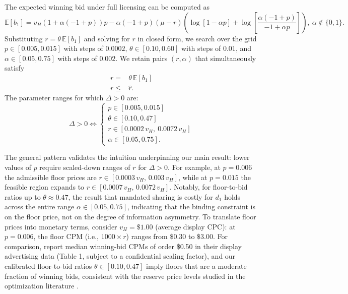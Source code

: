 \documentclass[11pt]{article}
\theoremstyle{plain}
\theoremstyle{definition}
\theoremstyle{plain}
\theoremstyle{plain}
\theoremstyle{plain}
\theoremstyle{plain}
\numberwithin{equation}{section}
\begin{document}
\vspace{2mm}

\noindent The expected winning bid under full licensing can be computed as
\begin{equation*}
    \mathbb{E}[b_1] = v_H (1+\alpha (-1+p)) p-\alpha (-1+p) (\mu-r) \left(\log[1-\alpha p]+\log\left[\frac{\alpha (-1+p)}{-1+\alpha p}\right]\right), \ \alpha \notin \{0,1\}.
\end{equation*}
Substituting $r = \theta \, \mathbb{E}[b_1]$ and solving for $r$ in closed form, we search over the grid $p \in [0.005, 0.015]$ with steps of $0.0002$, $\theta \in [0.10, 0.60]$ with steps of $0.01$, and $\alpha \in [0.05, 0.75]$ with steps of $0.002$. We retain pairs $(r, \alpha)$ that simultaneously satisfy
\begin{align}
    r =&  \theta \, \mathbb{E}[b_1] \label{eq:cal-floor}\\[5pt]
    r \leq&  \hat{r}. \label{eq:cal-rhat}
\end{align}
The parameter ranges for which $\Delta > 0$ are:
\begin{equation*}
    \Delta > 0 \iff \begin{cases}
        p \in [0.005, 0.015] \\[5pt]
        \theta \in [0.10, 0.47] \\[5pt]
        r \in [0.0002 \, v_H, \ 0.0072 \, v_H] \\[5pt]
        \alpha \in [0.05, 0.75].
    \end{cases}
\end{equation*}

\noindent The general pattern validates the intuition underpinning our main result: lower values of $p$ require scaled-down ranges of $r$ for $\Delta > 0$. For example, at $p = 0.006$ the admissible floor prices are $r \in [0.0003 \, v_H, \, 0.003 \, v_H]$, while at $p = 0.015$ the feasible region expands to $r \in [0.0007 \, v_H, \, 0.0072 \, v_H]$. Notably, for floor-to-bid ratios up to $\theta \approx 0.47$, the result that mandated sharing is costly for $d_1$ holds across the entire range $\alpha \in [0.05, 0.75]$, indicating that the binding constraint is on the floor price, not on the degree of information asymmetry. To translate floor prices into monetary terms, consider $v_H = \$1.00$ (average display CPC): at $p = 0.006$, the floor CPM (i.e., $1000 \times r$) ranges from $\$0.30$ to $\$3.00$. For comparison, \textcite{choiOptimizingReservePrices2023} report median winning-bid CPMs of order \$0.50 in their display advertising data (Table 1, subject to a confidential scaling factor), and our calibrated floor-to-bid ratios $\theta \in [0.10, 0.47]$ imply floors that are a moderate fraction of winning bids, consistent with the reserve price levels studied in the optimization literature \parencite{fengReservePriceOptimization2021, ostrovskyReservePricesInternet2023}.
\end{document}
